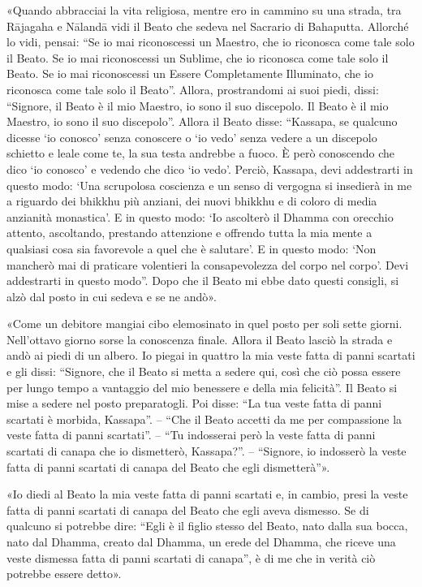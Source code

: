 «Quando abbracciai la vita religiosa, mentre ero in cammino su una strada, tra
Rājagaha e Nālandā vidi il Beato che sedeva nel Sacrario di Bahaputta. Allorché
lo vidi, pensai: “Se io mai riconoscessi un Maestro, che io riconosca come tale
solo il Beato. Se io mai riconoscessi un Sublime, che io riconosca come tale
solo il Beato. Se io mai riconoscessi un Essere Completamente Illuminato, che io
riconosca come tale solo il Beato”. Allora, prostrandomi ai suoi piedi, dissi:
“Signore, il Beato è il mio Maestro, io sono il suo discepolo. Il Beato è il mio
Maestro, io sono il suo discepolo”. Allora il Beato disse: “Kassapa, se qualcuno
dicesse ‘io conosco’ senza conoscere o ‘io vedo’ senza vedere a un discepolo
schietto e leale come te, la sua testa andrebbe a fuoco. È però conoscendo che
dico ‘io conosco’ e vedendo che dico ‘io vedo’. Perciò, Kassapa, devi
addestrarti in questo modo: ‘Una scrupolosa coscienza e un senso di vergogna si
insedierà in me a riguardo dei bhikkhu più anziani, dei nuovi bhikkhu e di
coloro di media anzianità monastica’. E in questo modo: ‘Io ascolterò il Dhamma
con orecchio attento, ascoltando, prestando attenzione e offrendo tutta la mia
mente a qualsiasi cosa sia favorevole a quel che è salutare’. E in questo modo:
‘Non mancherò mai di praticare volentieri la consapevolezza del corpo nel
corpo’. Devi addestrarti in questo modo”. Dopo che il Beato mi ebbe dato questi
consigli, si alzò dal posto in cui sedeva e se ne andò».

«Come un debitore mangiai cibo elemosinato in quel posto per soli sette giorni.
Nell’ottavo giorno sorse la conoscenza finale. Allora il Beato lasciò la strada
e andò ai piedi di un albero. Io piegai in quattro la mia veste fatta di panni
scartati e gli dissi: “Signore, che il Beato si metta a sedere qui, così che ciò
possa essere per lungo tempo a vantaggio del mio benessere e della mia
felicità”. Il Beato si mise a sedere nel posto preparatogli. Poi disse: “La tua
veste fatta di panni scartati è morbida, Kassapa”. – “Che il Beato accetti da me
per compassione la veste fatta di panni scartati”. – “Tu indosserai però la
veste fatta di panni scartati di canapa che io dismetterò, Kassapa?”. –
“Signore, io indosserò la veste fatta di panni scartati di canapa del Beato che
egli dismetterà”».

«Io diedi al Beato la mia veste fatta di panni scartati e, in cambio, presi la
veste fatta di panni scartati di canapa del Beato che egli aveva dismesso. Se di
qualcuno si potrebbe dire: “Egli è il figlio stesso del Beato, nato dalla sua
bocca, nato dal Dhamma, creato dal Dhamma, un erede del Dhamma, che riceve una
veste dismessa fatta di panni scartati di canapa”, è di me che in verità ciò
potrebbe essere detto».

